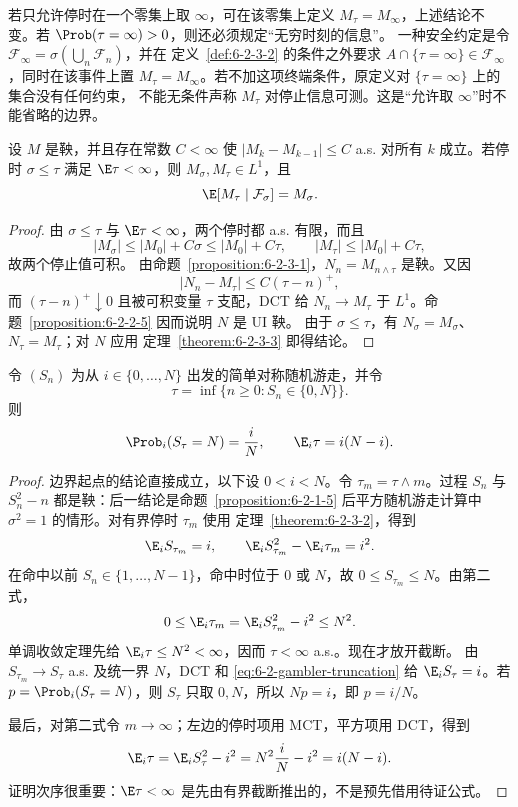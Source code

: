 若只允许停时在一个零集上取 $\infty$，可在该零集上定义
$M_\tau=M_\infty$，上述结论不变。若 $\Prob(\tau=\infty)>0$，则还必须规定“无穷时刻的信息”。
一种安全约定是令
$\mathcal F_\infty=\sigma(\bigcup_n\mathcal F_n)$，并在
定义~\ref{def:6-2-3-2} 的条件之外要求
$A\cap\{\tau=\infty\}\in\mathcal F_\infty$，同时在该事件上置
$M_\tau=M_\infty$。若不加这项终端条件，原定义对 $\{\tau=\infty\}$ 上的集合没有任何约束，
不能无条件声称 $M_\tau$ 对停止信息可测。这是“允许取 $\infty$”时不能省略的边界。

\begin{corollary}[可积停时与有界增量]\label{corollary:6-2-3-bounded-increments}
设 $M$ 是鞅，并且存在常数 $C<\infty$ 使
$|M_k-M_{k-1}|\le C$ a.s. 对所有 $k$ 成立。若停时
$\sigma\le\tau$ 满足 $\E\tau<\infty$，则 $M_\sigma,M_\tau\in L^1$，且
\[
  \E[M_\tau\mid\mathcal F_\sigma]=M_\sigma.
\]
\end{corollary}

\begin{proof}
由 $\sigma\le\tau$ 与 $\E\tau<\infty$，两个停时都 a.s. 有限，而且
\[
 |M_\sigma|\le|M_0|+C\sigma\le|M_0|+C\tau,
 \qquad |M_\tau|\le|M_0|+C\tau,
\]
故两个停止值可积。
由命题~\ref{proposition:6-2-3-1}，$N_n=M_{n\wedge\tau}$ 是鞅。又因
\[
 |N_n-M_\tau|
 \le C(\tau-n)^+,
\]
而 $(\tau-n)^+\downarrow0$ 且被可积变量 $\tau$ 支配，DCT 给
$N_n\to M_\tau$ 于 $L^1$。命题~\ref{proposition:6-2-2-5} 因而说明 $N$ 是 UI 鞅。
由于 $\sigma\le\tau$，有 $N_\sigma=M_\sigma$、$N_\tau=M_\tau$；对 $N$ 应用
定理~\ref{theorem:6-2-3-3} 即得结论。
\end{proof}

\begin{proposition}[随机游走赌徒破产]\label{proposition:6-2-3-4}
令 $(S_n)$ 为从 $i\in\{0,\ldots,N\}$ 出发的简单对称随机游走，并令
\[
  \tau=\inf\{n\ge0:S_n\in\{0,N\}\}.
\]
则
\[
  \Prob_i(S_\tau=N)=\frac{i}{N},
  \qquad
  \E_i\tau=i(N-i).
\]
\end{proposition}

\begin{proof}
边界起点的结论直接成立，以下设 $0<i<N$。令 $\tau_m=\tau\wedge m$。过程
$S_n$ 与 $S_n^2-n$ 都是鞅：后一结论是命题~\ref{proposition:6-2-1-5} 后平方随机游走计算中
$\sigma^2=1$ 的情形。对有界停时 $\tau_m$ 使用
定理~\ref{theorem:6-2-3-2}，得到
\begin{equation}\label{eq:6-2-gambler-truncation}
  \E_i S_{\tau_m}=i,
  \qquad
  \E_i S_{\tau_m}^2-\E_i\tau_m=i^2.
\end{equation}
在命中以前 $S_n\in\{1,\ldots,N-1\}$，命中时位于 $0$ 或 $N$，故
$0\le S_{\tau_m}\le N$。由第二式，
\[
  0\le\E_i\tau_m=\E_iS_{\tau_m}^2-i^2\le N^2.
\]
单调收敛定理先给 $\E_i\tau\le N^2<\infty$，因而 $\tau<\infty$ a.s.。现在才放开截断。
由 $S_{\tau_m}\to S_\tau$ a.s. 及统一界 $N$，DCT 和
\eqref{eq:6-2-gambler-truncation} 给 $\E_iS_\tau=i$。若
$p=\Prob_i(S_\tau=N)$，则 $S_\tau$ 只取 $0,N$，所以 $Np=i$，即 $p=i/N$。

最后，对第二式令 $m\to\infty$；左边的停时项用 MCT，平方项用 DCT，得到
\[
 \E_i\tau=\E_iS_\tau^2-i^2=N^2\frac{i}{N}-i^2=i(N-i).
\]
证明次序很重要：$\E\tau<\infty$ 是先由有界截断推出的，不是预先借用待证公式。
\end{proof}

